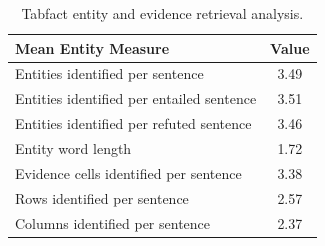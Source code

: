 \begin{table}[ht]
\center
\begin{tabular}{lc}
\hline
Mean Entity Measure & Value \\
\hline
Entities identified per sentence & 3.49 \\
Entities identified per entailed sentence & 3.51 \\
Entities identified per refuted sentence & 3.46 \\
Entity word length & 1.72 \\
Evidence cells identified per sentence & 3.38 \\
Rows identified per sentence & 2.57 \\
Columns identified per sentence & 2.37 \\
\hline
\end{tabular}
\caption{Tabfact entity and evidence retrieval analysis.}
\label{tab:tabfact_entity_analysis}
\end{table}